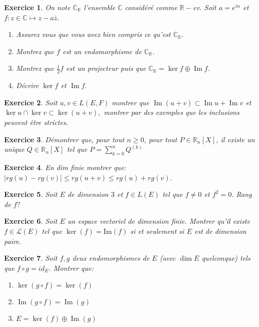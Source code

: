 \documentclass[12pt,a4paper]{article}
\newcommand{\R}{\mathbb{R}}
\newcommand{\C}{\mathbb{C}}
\DeclareMathOperator{\Ima }{Im}
\theoremstyle{break}
\theoremstyle{break}
\newtheorem{Exo}{Exercice}
\begin{document}
 \begin{Exo}
 	 On note $\C_{\R}$ l'ensemble $\C$ considéré comme $\R-$ev. Soit $a=e^{i\alpha }$ et $f:z\in\C\mapsto z-a\overline{z}$.

\begin{enumerate}
	\item Assurez vous que vous avez bien compris ce qu'est $\C_{\R}$.
	\item Montrez que $f$ est un endomorphisme de $\C_{\R}$.
	\item Montrez que $\frac{1}{2}f$ est un projecteur puis que $\C_{\R}=\ker f\oplus \Ima f$.
	\item Décrire $\ker f$ et $\Ima f.$
\end{enumerate}
 \end{Exo}


\begin{Exo}
	Soit $u,v\in L\left( E,F\right) $ montrer que $\Ima \left(u+v\right) \subset \Ima  u+\Ima  v$ et $\ker u\cap \ker v\subset \ker \left( u+v\right) ,$ montrer par des exemples que les inclusions peuvent être strictes.
\end{Exo}




\begin{Exo}
	Démontrer que, pour tout $n\geq 0$, pour tout $P\in\mathbb R_n[X]$, il existe un unique $Q\in\mathbb R_n[X]$ tel que $P=\sum_{k=0}^n Q^{(k)}$
\end{Exo}


\begin{Exo}
	En dim finie montrer que:
	$\left\vert rg\left( u\right) -rg\left( v\right) \right\vert \leqslant rg\left(u+v\right) \leqslant rg\left( u\right) +rg\left( v\right)$.
\end{Exo}
\begin{Exo}
	Soit $E$ de dimension $3$ et $f\in L\left( E\right) $ tel que $f\neq 0$
	et $f^{2}=0.$ Rang de $f?$
	
\end{Exo}

\begin{Exo}
	Soit $E$ un espace vectoriel de dimension finie.
	Montrer qu'il existe $f\in\mathcal L(E)$ tel que $\ker(f)=\textrm{Im}(f)$
	si et seulement si $E$ est de dimension paire.
\end{Exo}

\newpage
\begin{Exo}
	Soit $f,g$ deux endomorphismes de $E$ (avec $\dim E$ quelconque) tels que $f\circ g=id_E$. Montrer que:
	\begin{multicols}{3}
		\begin{enumerate}
			\item
			$\ker(g\circ f)=\ker(f)$
			\item
			$\Ima (g\circ f)=\Ima (g)$
			\item
			$E=\ker(f)\oplus \Ima(g)$
		\end{enumerate}
	\end{multicols}
\end{Exo}
\end{document}
